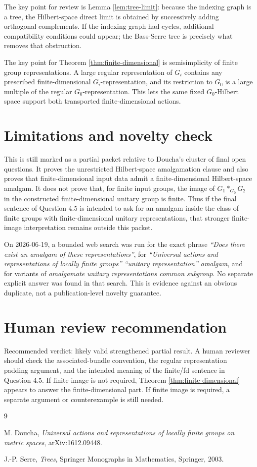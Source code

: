\documentclass[11pt]{article}
\begin{document}
The key point for review is Lemma \ref{lem:tree-limit}: because the indexing
graph is a tree, the Hilbert-space direct limit is obtained by successively
adding orthogonal complements.  If the indexing graph had cycles, additional
compatibility conditions could appear; the Bass-Serre tree is precisely what
removes that obstruction.

The key point for Theorem \ref{thm:finite-dimensional} is semisimplicity of
finite group representations.  A large regular representation of \(G_i\)
contains any prescribed finite-dimensional \(G_i\)-representation, and its
restriction to \(G_0\) is a large multiple of the regular \(G_0\)-representation.
This lets the same fixed \(G_0\)-Hilbert space support both transported
finite-dimensional actions.

\section*{Limitations and novelty check}

This is still marked as a partial packet relative to Doucha's cluster of final
open questions.  It proves the unrestricted Hilbert-space amalgamation clause
and also proves that finite-dimensional input data admit a finite-dimensional
Hilbert-space amalgam.  It does not prove that, for finite input groups, the
image of \(G_1*_{G_0}G_2\) in the constructed finite-dimensional unitary group
is finite.  Thus if the final sentence of Question 4.5 is intended to ask for
an amalgam inside the class of finite groups with finite-dimensional unitary
representations, that stronger finite-image interpretation remains outside
this packet.

On 2026-06-19, a bounded web search was run for the exact phrase
\emph{``Does there exist an amalgam of these representations''}, for
\emph{``Universal actions and representations of locally finite groups''
``unitary representation'' amalgam}, and for variants of \emph{amalgamate
unitary representations common subgroup}.  No separate explicit answer was
found in that search.  This is evidence against an obvious duplicate, not a
publication-level novelty guarantee.

\section*{Human review recommendation}

Recommended verdict: likely valid strengthened partial result.  A human
reviewer should check the associated-bundle convention, the regular
representation padding argument, and the intended meaning of the finite/fd
sentence in Question 4.5.  If finite image is not required, Theorem
\ref{thm:finite-dimensional} appears to answer the finite-dimensional part.
If finite image is required, a separate argument or counterexample is still
needed.

\begin{thebibliography}{9}

M. Doucha,
\emph{Universal actions and representations of locally finite groups on
metric spaces},
arXiv:1612.09448.

J.-P. Serre,
\emph{Trees},
Springer Monographs in Mathematics, Springer, 2003.

\end{thebibliography}
\end{document}
